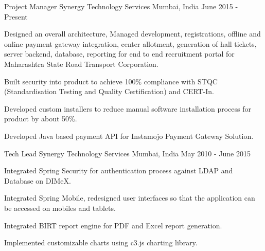 

\begin{cventries}

  \cventry
    {Project Manager} %
    {Synergy Technology Services} %
    {Mumbai, India} %
    {June 2015 - Present} %
    {
      \begin{cvitems} %
        \item {Designed an overall architecture, Managed development, registrations, offline and online payment gateway integration, center allotment, generation of hall tickets, server backend, database, reporting for end to end recruitment portal for Maharashtra State Road Transport Corporation.}
        \item {Built security into product to achieve 100\% compliance with STQC (Standardisation Testing and Quality Certification) and CERT-In.}
        \item {Developed custom installers to reduce manual software installation process for product by about 50\%.}
        \item {Developed Java based payment API for Instamojo Payment Gateway Solution.}
      \end{cvitems}
    }

  \cventry
    {Tech Lead} %
    {Synergy Technology Services} %
    {Mumbai, India} %
    {May 2010 - June 2015} %
    {
      \begin{cvitems} %
        \item {Integrated Spring Security for authentication process against LDAP and Database on DIMeX.}
        \item {Integrated Spring Mobile, redesigned user interfaces so that the application can be accessed on mobiles and tablets.}
        \item {Integrated BIRT report engine for PDF and Excel report generation. }
        \item {Implemented customizable charts using c3.js charting library.}
      \end{cvitems}
    }


\end{cventries}
